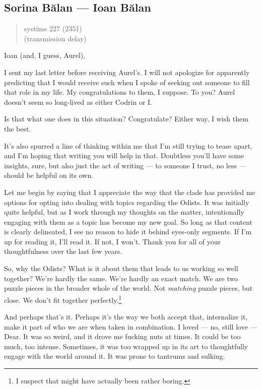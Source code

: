 \hypertarget{sorina-bux103lan-ioan-bux103lan}{%
\subsection{Sorina Bălan — Ioan Bălan}\label{sorina-bux103lan-ioan-bux103lan}}

\begin{quote}
systime 227 (2351)\\
(transmission delay)
\end{quote}

Ioan (and, I guess, Aurel),

I sent my last letter before receiving Aurel's. I will not apologize for apparently predicting that I would receive such when I spoke of seeking out someone to fill that role in my life. My congratulations to them, I suppose. To you? Aurel doesn't seem so long-lived as either Codrin or I.

Is that what one does in this situation? Congratulate? Either way, I wish them the best.

It's also spurred a line of thinking within me that I'm still trying to tease apart, and I'm hoping that writing you will help in that. Doubtless you'll have some insights, sure, but also just the act of writing — to someone I trust, no less — should be helpful on its own.

Let me begin by saying that I appreciate the way that the clade has provided me options for opting into dealing with topics regarding the Odists. It was initially quite helpful, but as I work through my thoughts on the matter, intentionally engaging with them as a topic has become my new goal. So long as that content is clearly delineated, I see no reason to hide it behind eyes-only segments. If I'm up for reading it, I'll read it. If not, I won't. Thank you for all of your thoughtfulness over the last few years.

So, why the Odists? What is it about them that leads to us working so well together? We're hardly the same. We're hardly an exact match. We are two puzzle pieces in the broader whole of the world. Not \emph{matching} puzzle pieces, but close. We don't fit together perfectly.\footnote{I suspect that might have actually been rather boring.}

And perhaps that's it. Perhaps it's the way we both accept that, internalize it, make it part of who we are when taken in combination. I loved — no, still love — Dear. It was so weird, and it drove me fucking nuts at times. It could be too much, too intense. Sometimes, it was too wrapped up in its art to thoughtfully engage with the world around it. It was prone to tantrums and sulking.

